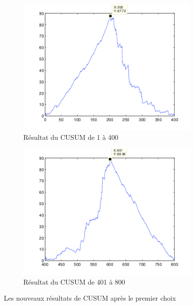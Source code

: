 \documentclass[french,11pt,notitlepage]{report}
\begin{document}
	\begin{figure}[hp]
		\begin{subfigure}[t]{.49\textwidth}
		  \includegraphics[width=\linewidth,height=.24\textheight]{mle11.png}
			\caption{Résultat du CUSUM de 1 à 400}
			\label{mle11}
		\end{subfigure}
		\hfill
		\begin{subfigure}[t]{.49\textwidth}
			\includegraphics[width=\linewidth,height=.24\textheight]{mle12.png}
			\caption{Résultat du CUSUM de 401 à 800}
			\label{mle12}
		\end{subfigure}
	\caption{Les nouveaux résultats de CUSUM après le premier choix}
	\label{testdikt2}
	\end{figure}
	
\end{document}
